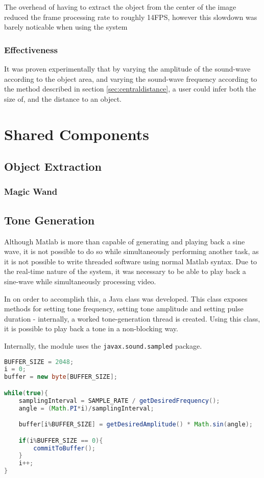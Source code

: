 The overhead of having to extract the object from the center of the image reduced the frame processing rate to roughly 14FPS, however this slowdown was barely noticable when using the system

\subsubsection{Effectiveness}
It was proven experimentally that by varying the amplitude of the sound-wave according to the object area, and varying the sound-wave frequency according to the method described in section \ref{sec:centraldistance}, a user could infer both the size of, and the distance to an object. 

\section{Shared Components}
\label{sec:sharedcomponents}
\subsection{Object Extraction}
\subsubsection{Magic Wand}
\label{sec:magicwand}

\subsection{Tone Generation}
Although Matlab is more than capable of generating and playing back a sine wave, it is not possible to do so while simultaneously performing another task, as it is not possible to write threaded software using normal Matlab syntax. Due to the real-time nature of the system, it was necessary to be able to play back a sine-wave while simultaneously processing video.

In on order to accomplish this, a Java class was developed. This class exposes methods for setting tone frequency, setting tone amplitude and setting pulse duration - internally, a worked tone-generation thread is created. Using this class, it is possible to play back a tone in a non-blocking way. 

Internally, the module uses the \lstinline|javax.sound.sampled| package. 

\begin{lstlisting}[language=Java, caption={Fundementals of Tone Generation}]
BUFFER_SIZE = 2048;
i = 0;
buffer = new byte[BUFFER_SIZE];

while(true){
    samplingInterval = SAMPLE_RATE / getDesiredFrequency();
    angle = (Math.PI*i)/samplingInterval;

    buffer[i%BUFFER_SIZE] = getDesiredAmplitude() * Math.sin(angle);

    if(i%BUFFER_SIZE == 0){
        commitToBuffer();
    }
    i++;
}
    
\end{lstlisting}

